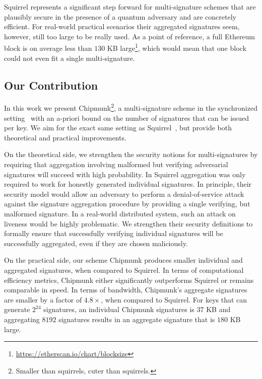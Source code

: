 Squirrel represents a significant step forward for multi-signature schemes that are plausibly secure in the presence of a quantum adversary and are concretely efficient.
For real-world practical scenarios their aggregated signatures seem, however, still too large to be really used.
As a point of reference, a full Ethereum block is on average less than $130$ KB large\footnote{\url{https://etherscan.io/chart/blocksize}}, which would mean that one block could not even fit a single multi-signature.

\subsection{Our Contribution}
In this work we present Chipmunk\footnote{Smaller than squirrels, cuter than squirrels.}, a multi-signature scheme in the synchronized setting~\cite{PKC:GenRam06,CCS:AhnGreHoh10,EC:HohWat18,USENIX:DGNW20} with an a-priori bound on the number of signatures that can be issued per key. 
We aim for the exact same setting as Squirrel~\cite{CCS:FleSimZha22}, but provide both theoretical and practical improvements.

On the theoretical side, we strengthen the security notions for multi-signatures by requiring that aggregation involving malformed but verifying adversarial signatures will succeed with high probability. 
In Squirrel aggregation was only required to work for honestly generated individual signatures. 
In principle, their security model would allow an adversary to perform a denial-of-service attack against the signature aggregation procedure by providing a single verifying, but malformed signature.
In a real-world distributed system, such an attack on liveness would be highly problematic.
We strengthen their security definitions to formally ensure that successfully verifying individual signatures will be successfully aggregated, even if they are chosen maliciously. 

On the practical side, our scheme Chipmunk produces smaller individual and aggregated signatures, when compared to Squirrel.
In terms of computational efficiency metrics, Chipmunk either significantly outperforms Squirrel or remains comparable in speed.
In terms of bandwidth, Chipmunk's aggregate signatures are smaller by a factor of $4.8\times$, when compared to Squirrel.
For keys that can generate $2^{24}$ signatures, an individual Chipmunk signatures is $37$ KB and aggregating $8192$ signatures results in an aggregate signature that is $180$ KB large.


